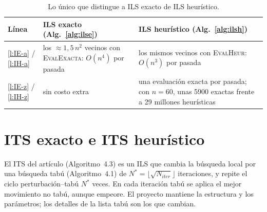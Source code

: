 \documentclass{article}
\newcommand{\EvalE}{\mbox{\textsc{EvalExacta}}}
\newcommand{\EvalH}{\mbox{\textsc{EvalHeur}}}
\newcommand{\Niter}{N_{\mathit{iter}}}
\begin{document}
\begin{table}[H]\centering\small
\caption{Lo único que distingue a ILS exacto de ILS heurístico.}
\renewcommand{\arraystretch}{1.3}
\begin{tabularx}{\linewidth}{L{1.6cm} Y Y}
\toprule
{}\textbf{Línea} & \textbf{ILS exacto (Alg.~\ref{alg:ilse})} & \textbf{ILS heurístico (Alg.~\ref{alg:ilsh})} \\
\midrule
\ref{l:IE-a} / \ref{l:IH-a} & los $\approx 1{,}5\,n^2$ vecinos con \EvalE: $O(n^4)$ por pasada & los mismos vecinos con \EvalH: $O(n^3)$ por pasada \\
\ref{l:IE-z} / \ref{l:IH-z} & sin costo extra & una evaluación exacta por pasada; con $n = 60$, unas 5900 exactas frente a 29 millones heurísticas \\
\bottomrule
\end{tabularx}
\end{table}

\section{ITS exacto e ITS heurístico}

El ITS del artículo (Algoritmo~4.3) es un ILS que cambia la búsqueda local por una búsqueda tabú (Algoritmo~4.1) de $N^* = \lfloor\sqrt{\Niter}\rfloor$ iteraciones, y repite el ciclo perturbación--tabú $N^*$ veces. En cada iteración tabú se aplica el mejor movimiento no tabú, aunque empeore. El proyecto mantiene la estructura y los parámetros; los detalles de la lista tabú son los que cambian.
\end{document}
